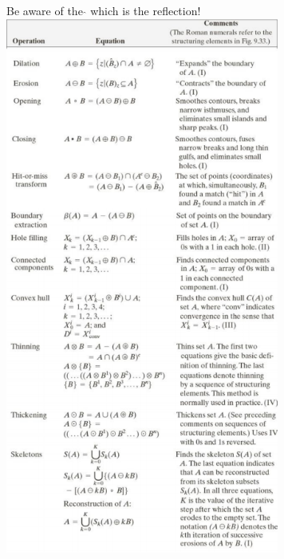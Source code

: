 
  \begin{minipage}{9.5cm}
    Be aware of the $\hat{ }$ which is the reflection!\\
    \includegraphics[width=9cm]{./images/morphology_table.png}
  \end{minipage}
